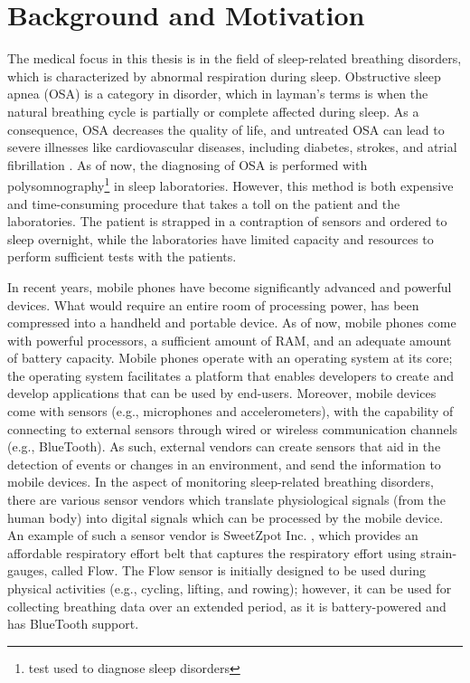 \section{Background and Motivation}

The medical focus in this thesis is in the field of sleep-related breathing disorders, which is characterized by abnormal respiration during sleep. Obstructive sleep apnea (OSA) is a category in disorder, which in layman's terms is when the natural breathing cycle is partially or complete affected during sleep. As a consequence, OSA decreases the quality of life, and untreated OSA can lead to severe illnesses like cardiovascular diseases, including diabetes, strokes, and atrial fibrillation \cite{sleep_disorder}. As of now, the diagnosing of OSA is performed with polysomnography\footnote{test used to diagnose sleep disorders} in sleep laboratories. However, this method is both expensive and time-consuming procedure that takes a toll on the patient and the laboratories. The patient is strapped in a contraption of sensors and ordered to sleep overnight, while the laboratories have limited capacity and resources to perform sufficient tests with the patients.

In recent years, mobile phones have become significantly advanced and powerful devices. What would require an entire room of processing power, has been compressed into a handheld and portable device. As of now, mobile phones come with powerful processors, a sufficient amount of RAM, and an adequate amount of battery capacity. Mobile phones operate with an operating system at its core; the operating system facilitates a platform that enables developers to create and develop applications that can be used by end-users. Moreover, mobile devices come with sensors (e.g., microphones and accelerometers), with the capability of connecting to external sensors through wired or wireless communication channels (e.g., BlueTooth). As such, external vendors can create sensors that aid in the detection of events or changes in an environment, and send the information to mobile devices. In the aspect of monitoring sleep-related breathing disorders, there are various sensor vendors which translate physiological signals (from the human body) into digital signals which can be processed by the mobile device. An example of such a sensor vendor is SweetZpot Inc. \cite{flow}, which provides an affordable respiratory effort belt that captures the respiratory effort using strain-gauges, called Flow. The Flow sensor is initially designed to be used during physical activities (e.g., cycling, lifting, and rowing); however, it can be used for collecting breathing data over an extended period, as it is battery-powered and has BlueTooth support. 


